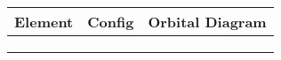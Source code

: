 \documentclass[notes=onlyslideswithnotes,notes=hide]{beamer}
\begin{document}

\begin{onyourown}%
	\begin{tabularx}{\linewidth} {c
			>{\centering\arraybackslash}m{1in}
		>{\centering\arraybackslash}X}
		\toprule
		\bfseries Element & \bfseries \ch{e^{-}} Config & \bfseries Orbital
		Diagram \\ \midrule
		\parbox[c][4em][c]{0.5in}{\centering{} }& \\
		\parbox[c][4em][c]{0.5in}{\centering{} } & \\
		\parbox[c][4em][c]{0.5in}{\centering{}} & \\
		\bottomrule
	\end{tabularx}
\end{onyourown}

\end{document}
